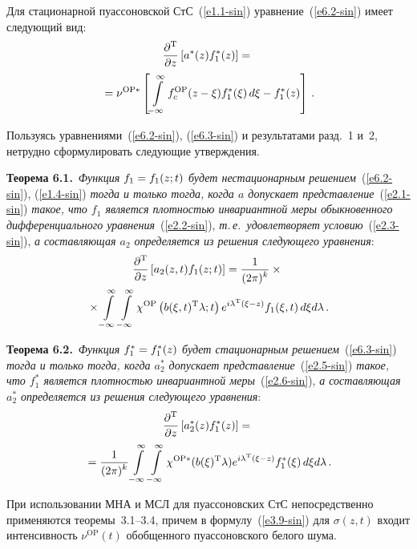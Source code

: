 \begin{multicols}{2}
Для  стационарной пуассоновской СтС~(\ref{e1.1-sin}) уравнение~(\ref{e6.2-sin}) имеет следующий вид:
\begin{multline}
\displaystyle\frac{\displaystyle \partial^{\mathrm{T}}\mathstrut}{\displaystyle \partial z\mathstrut} \left[ a^* (z) f_1^* (z)\right] = {}\\
{}=
\nu^{\mathrm{OP} *} \left[ \int\limits_{-\infty}^\infty f_c^{\mathrm{OP}} (z-\xi) f_1^* (\xi)\, d\xi- 
f_1^* (z)\right]\,.\label{e6.3-sin}
\end{multline}

Пользуясь уравнениями~(\ref{e6.2-sin}), (\ref{e6.3-sin})  
и результатами разд.~1 и~2, нетрудно сформулировать следующие утверждения.

\medskip

\noindent
\textbf{Теорема 6.1.}\ \textit{Функция $f_1 \hm= f_1(z;t)$ будет
нестационарным решением}~(\ref{e6.2-sin}), (\ref{e1.4-sin}) \textit{тогда и только тогда, 
когда $a$ допускает представление}~(\ref{e2.1-sin}) \textit{такое, что $f_1$ является плот\-ностью
инвариантной меры обыкновенного дифференциального уравнения}~(\ref{e2.2-sin}),
\textit{т.\,е.\ удовле\-тво\-ря\-ет условию}~(\ref{e2.3-sin}), \textit{а составляющая $a_2$ определяется
из решения следующего уравнения}:
\begin{multline*}
    \displaystyle\frac{\displaystyle \partial^{\mathrm{T}}\mathstrut}{\displaystyle \partial z\mathstrut} \left[ a_2 (z,t) f_1 (z;t)\right] =
     \displaystyle\frac{\displaystyle 1\mathstrut}{\displaystyle (2\pi)^k\mathstrut}\times{}\\
     {}\times \int\limits_{-\infty}^\infty\int\limits_{-\infty}^\infty \chi^{\mathrm{OP}} 
    \left(b(\xi,t)^{\mathrm{T}} \lambda;t\right) e^{i\lambda^{\mathrm{T}}(\xi-z)} f_1(\xi,t)\,d\xi d\lambda\,.
    \end{multline*}


\noindent
\textbf{Теорема 6.2.}\ \textit{Функция $f_1^* \hm= f_1^* (z)$ будет стационарным 
решением}~(\ref{e6.3-sin}) \textit{тогда и только тогда, когда $a_2^*$ допускает 
представление}~(\ref{e2.5-sin}) \textit{такое, что  $f_1^*$ является плот\-ностью 
инвариантной меры}~(\ref{e2.6-sin}), \textit{а составляющая $a_2^{*}$ определяется 
из решения следующего уравнения}:
\begin{multline*}
\displaystyle\frac{\displaystyle \partial^{\mathrm{T}} \mathstrut}{\displaystyle \partial z\mathstrut} \left[ a_2^{*} (z) f_1^* (z)\right] ={}\\
{}=
    \displaystyle\frac{\displaystyle 1\mathstrut}{\displaystyle (2\pi)^k\mathstrut} \int\limits_{-\infty}^\infty\int\limits_{-\infty}^\infty \chi^{\mathrm{OP} *} (b(\xi)^{\mathrm{T}} \lambda) 
    e^{i\lambda^{\mathrm{T}}(\xi-z)} f_1^*(\xi)\,d\xi d\lambda\,.
    \end{multline*}

При использовании МНА и МСЛ для пуассоновских СтС непосредственно применяются теоремы~3.1--3.4, 
причем в формулу~(\ref{e3.9-sin}) для  
$\sigma(z,t)$ входит интенсивность 
$\nu^{\mathrm{OP}} (t)$ обобщенного пуассоновского белого шума.


\end{multicols}
